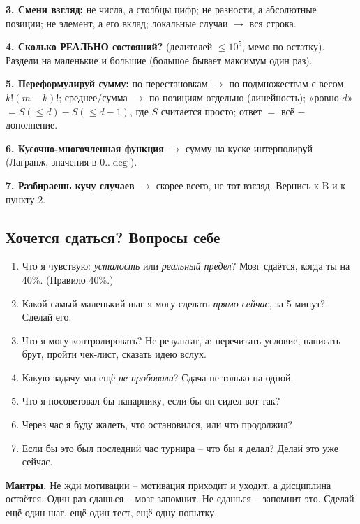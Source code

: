 \par \textbf{3. Смени взгляд:} не числа, а столбцы цифр; не разности, а абсолютные позиции; не элемент, а его вклад; локальные случаи $\to$ вся строка.
\par \textbf{4. Сколько РЕАЛЬНО состояний?} (делителей $\le10^5$, мемо по остатку). Раздели на маленькие и большие (большое бывает максимум один раз).
\par \textbf{5. Переформулируй сумму:} по перестановкам $\to$ по подмножествам с весом $k!(m-k)!$; среднее/сумма $\to$ по позициям отдельно (линейность); «ровно $d$» $=S(\le d)-S(\le d-1)$, где $S$ считается просто; ответ $=$ всё $-$ дополнение.
\par \textbf{6. Кусочно-многочленная функция} $\to$ сумму на куске интерполируй (Лагранж, значения в $0..\deg$).
\par \textbf{7. Разбираешь кучу случаев} $\to$ скорее всего, не тот взгляд. Вернись к B и к пункту 2.


\subsection{Хочется сдаться? Вопросы себе}
\par\begin{enumerate}
\item Что я чувствую: \emph{усталость} или \emph{реальный предел}? Мозг сдаётся, когда ты на 40\%. (Правило 40\%.)
\item Какой самый маленький шаг я могу сделать \emph{прямо сейчас}, за 5 минут? Сделай его.
\item Что я могу контролировать? Не результат, а: перечитать условие, написать брут, пройти чек-лист, сказать идею вслух.
\item Какую задачу мы ещё \emph{не пробовали}? Сдача не только на одной.
\item Что я посоветовал бы напарнику, если бы он сидел вот так?
\item Через час я буду жалеть, что остановился, или что продолжил?
\item Если бы это был последний час турнира -- что бы я делал? Делай это уже сейчас.
\end{enumerate}
\par \textbf{Мантры.} Не жди мотивации -- мотивация приходит и уходит, а дисциплина остаётся. Один раз сдашься -- мозг запомнит. Не сдашься -- запомнит это. Сделай ещё один шаг, ещё один тест, ещё одну попытку.
